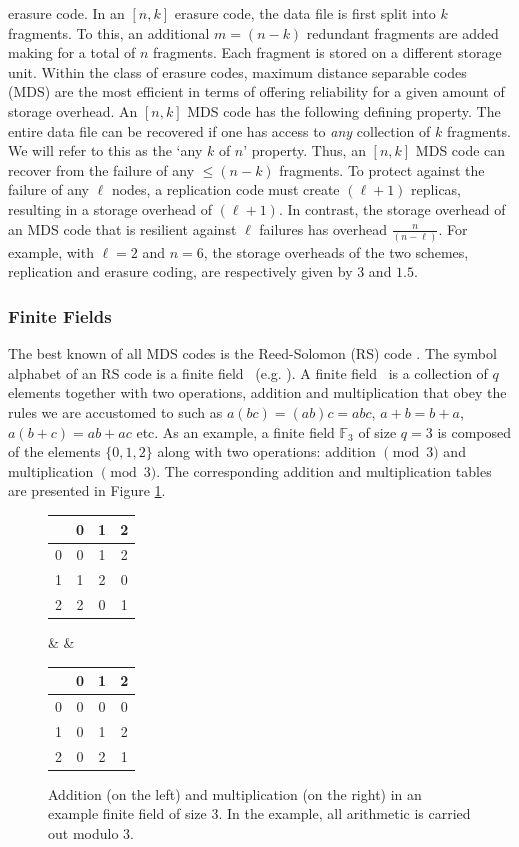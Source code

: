 \begin{multicols}{2}
\noindent
 erasure code.  In an $[n,k]$ erasure code, the data file is first split into $k$ fragments.  To this, an additional $m=(n-k)$ redundant fragments are added making for a total of $n$ fragments.  Each fragment is stored on a different storage unit. Within the class of erasure codes, maximum distance separable codes (MDS) are the most efficient in terms of offering reliability for a given amount of storage overhead.  An $[n,k]$ MDS code has the following defining property.  The entire data file can be recovered if one has access to {\em any} collection of $k$ fragments.  We will refer to this as the `any $k$ of $n$' property. Thus, an $[n,k]$ MDS code can recover from the failure of any $\leq (n-k)$ fragments. To protect against the failure of any $\ell$ nodes, a replication code must create $(\ell+1)$ replicas, resulting in a storage overhead of $(\ell+1)$. In contrast, the storage overhead of an MDS code that is resilient against $\ell$ failures has overhead $\frac{n}{(n-\ell)}$. For example, with $\ell=2$ and $n=6$, the storage overheads of the two schemes, replication and erasure coding, are respectively given by $3$ and $1.5$.\\[-22pt]

\subsubsection{Finite Fields}
\vskip -0.5cm
	
The best known of all MDS codes is the Reed-Solomon (RS) code \cite{ReeSol}.  The symbol alphabet of an RS code is a finite field \fq\ (e.g. \cite[Ch.~3]{MacSlo}).  A finite field \fq\ is a collection of $q$ elements together with two operations, addition and multiplication that obey the rules we are accustomed to such as $a(bc)=(ab)c=abc$, $a+b=b+a$, $a(b+c)=ab+ac$ etc. As an example, a finite field $\mathbb{F}_3$ of size $q=3$ is composed of the elements $\{0,1,2\}$ along with two operations: addition $\! \! \pmod{3}$ and multiplication $\! \! \pmod{3}$.  The corresponding addition and multiplication tables are presented in Figure \ref{004-fig3}.

\begin{figure}[H]
\bean 
\begin{tabular}{c|ccc}
& 0 & 1 & 2 \\ \hline 
0 & 0 & 1 & 2 \\ 
1 & 1 & 2 & 0 \\ 
2 & 2 & 0 & 1 
\end{tabular}
& & 
\begin{tabular}{c|ccc}
& 0 & 1 & 2 \\ \hline 
0 & 0 & 0 & 0 \\ 
1 & 0 & 1 & 2 \\ 
2 & 0 & 2 & 1 
\end{tabular}
\eean 
\caption{Addition (on the left)  and multiplication (on the right) in an example finite field of size $3$.  In the example, all arithmetic is carried out modulo $3$. }\label{004-fig3} 
\end{figure}
\vskip -0.5cm


\end{multicols}
